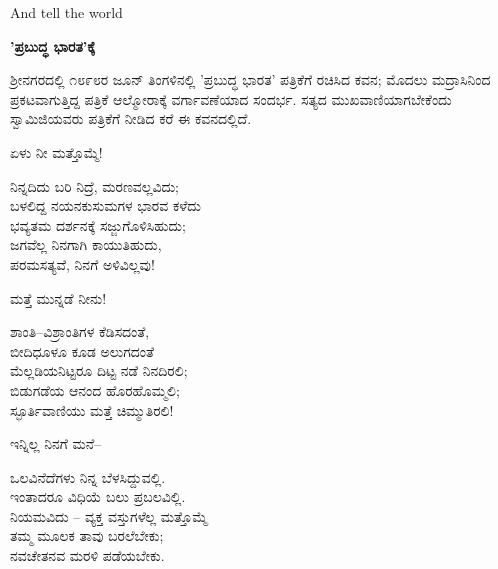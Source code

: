 And tell the world

\begin{myquote}
\end{myquote}

\begin{center}
\textbf{'ಪ್ರಬುದ್ಧ ಭಾರತ'ಕ್ಕೆ}
\end{center}

ಶ‍್ರೀನಗರದಲ್ಲಿ ೧೮೯೮ರ ಜೂನ್ ತಿಂಗಳಿನಲ್ಲಿ 'ಪ್ರಬುದ್ಧ ಭಾರತ' ಪತ್ರಿಕೆಗೆ ರಚಿಸಿದ ಕವನ; ಮೊದಲು ಮದ್ರಾಸಿನಿಂದ ಪ್ರಕಟವಾಗುತ್ತಿದ್ದ ಪತ್ರಿಕೆ ಆಲ್ಮೋರಾಕ್ಕೆ ವರ್ಗಾವಣೆಯಾದ ಸಂದರ್ಭ. ಸತ್ಯದ ಮುಖವಾಣಿಯಾಗಬೇಕೆಂದು ಸ್ವಾಮಿಜಿಯವರು ಪತ್ರಿಕೆಗೆ ನೀಡಿದ ಕರೆ ಈ ಕವನದಲ್ಲಿದೆ.

ಏಳು ನೀ ಮತ್ತೊಮ್ಮೆ!

\begin{myquote}
ನಿನ್ನದಿದು ಬರಿ ನಿದ್ರೆ, ಮರಣವಲ್ಲವಿದು;\\ಬಳಲಿದ್ದ ನಯನಕುಸುಮಗಳ ಭಾರವ ಕಳೆದು\\ಭವ್ಯತಮ ದರ್ಶನಕ್ಕೆ ಸಜ್ಜುಗೊಳಿಸಿಹುದು;\\ಜಗವೆಲ್ಲ ನಿನಗಾಗಿ ಕಾಯುತಿಹುದು,\\ಪರಮಸತ್ಯವೆ, ನಿನಗೆ ಅಳಿವಿಲ್ಲವು!
\end{myquote}

ಮತ್ತೆ ಮುನ್ನಡೆ ನೀನು!

\begin{myquote}
ಶಾಂತಿ–ವಿಶ್ರಾಂತಿಗಳ ಕೆಡಿಸದಂತೆ,\\ಬೀದಿಧೂಳೂ ಕೂಡ ಅಲುಗದಂತೆ\\ಮೆಲ್ಲಡಿಯನಿಟ್ಟರೂ ದಿಟ್ಟ ನಡೆ ನಿನದಿರಲಿ;\\ಬಿಡುಗಡೆಯ ಆನಂದ ಹೊರಹೊಮ್ಮಲಿ;\\ಸ್ಫೂರ್ತಿವಾಣಿಯು ಮತ್ತೆ ಚಿಮ್ಮುತಿರಲಿ!
\end{myquote}

ಇನ್ನಿಲ್ಲ ನಿನಗೆ ಮನೆ–

\begin{myquote}
ಒಲವಿನೆದೆಗಳು ನಿನ್ನ ಬೆಳಸಿದ್ದುವಲ್ಲಿ.\\ಇಂತಾದರೂ ವಿಧಿಯೆ ಬಲು ಪ್ರಬಲವಿಲ್ಲಿ.\\ನಿಯಮವಿದು – ವ್ಯಕ್ತ ವಸ್ತುಗಳೆಲ್ಲ ಮತ್ತೊಮ್ಮೆ\\ತಮ್ಮ ಮೂಲಕ ತಾವು ಬರಲೆಬೇಕು;\\ನವಚೇತನವ ಮರಳಿ ಪಡೆಯಬೇಕು.
\end{myquote}

